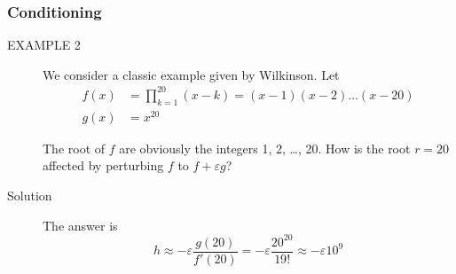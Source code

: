 \documentclass[notheorems,mathserif,table,compress]{beamer}  %
\begin{document}
\begin{frame}
\frametitle{Conditioning}
\begin{description}
\item[EXAMPLE 2] We consider a classic example given by Wilkinson. Let 
\begin{equation*}
\begin{split}
f(x)&=\prod^{20}_{k=1}(x-k)=(x-1)(x-2)\ldots(x-20)\\
g(x)&=x^{20}
\end{split}
\end{equation*}

The root of $f$ are obviously the integers 1, 2, \ldots, 20. How is the root $r=20$ affected by perturbing $f$ to $f+\varepsilon g$?
\item[Solution]The answer is 
\begin{displaymath}
h\approx-\varepsilon\frac{g(20)}{f'(20)}=-\varepsilon\frac{20^{20}}{19!}\approx-\varepsilon 10^9
\end{displaymath}

\end{description}
\end{frame}
\end{document}
